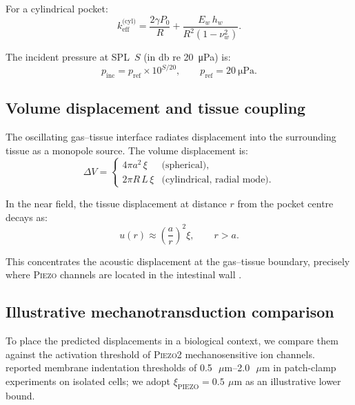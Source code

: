 \documentclass[12pt]{article}
\newcommand{\piezo}{\textsc{Piezo}}
\newcommand{\um}{\ensuremath{\,\mu\text{m}}}
\begin{document}
For a cylindrical pocket:
\begin{equation}
  k_\text{eff}^\text{(cyl)} = \frac{2\gamma P_0}{R}
    + \frac{E_w\,h_w}{R^2(1-\nu_w^2)}.
  \label{eq:keff_cyl}
\end{equation}

The incident pressure at SPL~$S$ (in \si{\decibel} re \SI{20}{\micro\pascal}) is:
\begin{equation}
  p_\text{inc} = p_\text{ref} \times 10^{S/20},
  \qquad p_\text{ref} = \SI{20}{\micro\pascal}.
  \label{eq:spl}
\end{equation}


\subsection{Volume displacement and tissue coupling}
\label{sec:coupling}

The oscillating gas--tissue interface radiates displacement into the
surrounding tissue as a monopole source.  The volume displacement is:
\begin{equation}
  \Delta V =
  \begin{cases}
    4\pi a^2\,\xi & \text{(spherical)}, \\
    2\pi R\,L\,\xi & \text{(cylindrical, radial mode)}.
  \end{cases}
  \label{eq:dV}
\end{equation}

In the near field, the tissue displacement at distance $r$ from the pocket
centre decays as:
\begin{equation}
  u(r) \approx \left(\frac{a}{r}\right)^{\!2} \xi, \qquad r > a.
  \label{eq:monopole}
\end{equation}

This concentrates the acoustic displacement at the gas--tissue boundary,
precisely where \piezo{} channels are located in the intestinal wall
\citep{Alcaino2017,Mazzuoli2015}.


\subsection{Illustrative mechanotransduction comparison}
\label{sec:piezo}

To place the predicted displacements in a biological context, we compare
them against the activation threshold of \piezo2 mechanosensitive ion
channels.  \citet{Coste2010} reported membrane indentation thresholds of
\SIrange{0.5}{2.0}{\um} in patch-clamp experiments on isolated cells;
we adopt $\xi_\text{PIEZO} = \SI{0.5}{\um}$ as an illustrative lower
bound.
\end{document}
